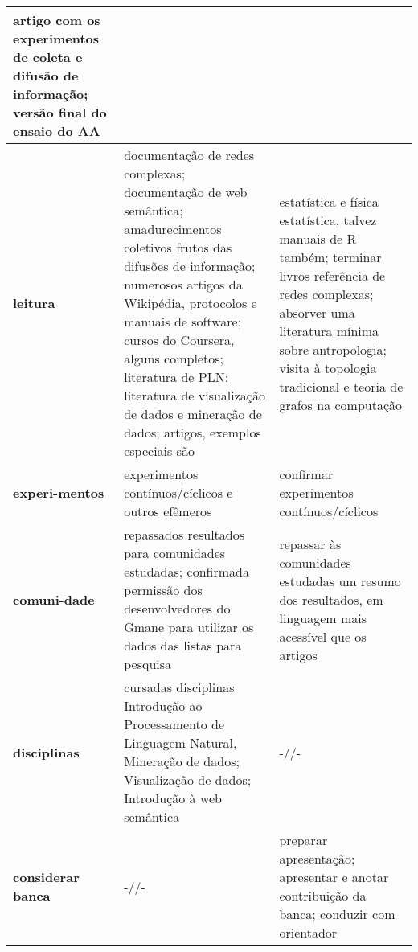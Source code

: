 \documentclass[a4paper,openright,12pt]{report} %
\begin{document}
\begin{table}[h]
\begin{tabular}{p{1.3cm}||p{7.6cm}|p{7.1cm}}
    artigo com os experimentos de coleta e difusão de informação;
    versão final do ensaio do AA~\cite{ensaaio}\\\hline
    {\bf leitura }     & documentação de redes complexas;
            documentação de web semântica;
            amadurecimentos coletivos frutos das difusões de informação;
                   numerosos artigos da Wikipédia, protocolos e manuais de software;
               cursos do Coursera, alguns completos;
               literatura de PLN;
               literatura de visualização de dados e mineração de dados;
               artigos, exemplos especiais são~\cite{} & 
                               estatística e física estatística, talvez manuais de R também;
                       terminar livros referência de redes complexas;
                       absorver uma literatura mínima sobre antropologia;
                       visita à topologia tradicional e teoria de grafos na computação \\\hline\hline
                       {\bf experi-mentos} & experimentos contínuos/cíclicos e outros efêmeros  & confirmar experimentos contínuos/cíclicos \\\hline
                       {\bf comuni-dade  }& repassados resultados para comunidades estudadas;
                       confirmada permissão dos desenvolvedores
                      do Gmane para utilizar os dados das listas para pesquisa
                        & repassar às comunidades estudadas um resumo dos resultados, em linguagem mais acessível que os artigos \\\hline
                      {\bf disciplinas} & cursadas disciplinas Introdução ao Processamento de Linguagem Natural,
                       Mineração de dados;
                       Visualização de dados;
                       Introdução à web semântica & -//- \\\hline
                       {\bf considerar banca} & -//-  & preparar apresentação; apresentar e anotar contribuição da banca; conduzir com orientador \\\hline
\end{tabular}
\end{table}
\end{document}
